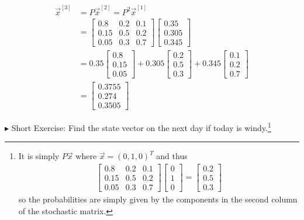\begin{solution}
\begin{align*}
\vec{x}^{[3]} &= P\vec{x}^{[2]} = P^2\vec{x}^{[1]} \\
&=
\begin{bmatrix}
0.8 & 0.2 & 0.1\\
0.15 & 0.5 & 0.2 \\
0.05 & 0.3 & 0.7
\end{bmatrix}   
\begin{bmatrix}
0.35 \\
0.305 \\
0.345
\end{bmatrix} \\
&= 0.35
\begin{bmatrix}
0.8 \\
0.15 \\
0.05
\end{bmatrix}
+ 0.305
\begin{bmatrix}
0.2 \\
0.5 \\
0.3
\end{bmatrix}
+ 0.345
\begin{bmatrix}
0.1 \\
0.2 \\
0.7
\end{bmatrix} \\
&=
\begin{bmatrix}
0.3755\\ 
0.274\\
0.3505
\end{bmatrix}
\end{align*}
\end{solution}
$\blacktriangleright$ Short Exercise: Find the state vector on the next day if today is windy.\footnote{It is simply $P\vec{x}$ where $\vec{x} = (0,1,0)^T$ and thus
\begin{align*}
\begin{bmatrix}
0.8 & 0.2 & 0.1\\
0.15 & 0.5 & 0.2 \\
0.05 & 0.3 & 0.7
\end{bmatrix}  
\begin{bmatrix}
0 \\
1 \\
0
\end{bmatrix}
=
\begin{bmatrix}
0.2 \\
0.5 \\
0.3
\end{bmatrix}
\end{align*} so the probabilities are simply given by the components in the second column of the stochastic matrix.}

